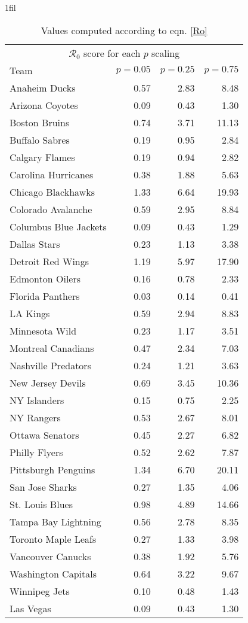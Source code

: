 \documentclass[11pt]{report}            %
\makeatletter
\newcommand{\ro}{\mathcal{R}_0}
\newcommand*{\centerfloat}{%
  \parindent \z@
  \leftskip \z@ \@plus 1fil \@minus \textwidth
  \rightskip\leftskip
  \parfillskip \z@skip}
\makeatother
\begin{document}
\begin{table}[H]
\centerfloat
\begin{tabular}{lrrr}
\hline
\multicolumn{4}{c}{$\ro$ score for each $p$ scaling} \\
Team & $p=0.05$ & $p=0.25$ & $p=0.75$ \\ 
\hline
Anaheim Ducks & 0.57 & 2.83 & 8.48 \\ 
Arizona Coyotes & 0.09 & 0.43 & 1.30 \\ 
Boston Bruins & 0.74 & 3.71 & 11.13 \\ 
Buffalo Sabres & 0.19 & 0.95 & 2.84 \\ 
Calgary Flames & 0.19 & 0.94 & 2.82 \\ 
Carolina Hurricanes & 0.38 & 1.88 & 5.63 \\ 
Chicago Blackhawks & 1.33 & 6.64 & 19.93 \\ 
Colorado Avalanche & 0.59 & 2.95 & 8.84 \\ 
Columbus Blue Jackets & 0.09 & 0.43 & 1.29 \\ 
Dallas Stars & 0.23 & 1.13 & 3.38 \\ 
Detroit Red Wings & 1.19 & 5.97 & 17.90 \\ 
Edmonton Oilers & 0.16 & 0.78 & 2.33 \\ 
Florida Panthers & 0.03 & 0.14 & 0.41 \\ 
LA Kings & 0.59 & 2.94 & 8.83 \\ 
Minnesota Wild & 0.23 & 1.17 & 3.51 \\ 
Montreal Canadians & 0.47 & 2.34 & 7.03 \\ 
Nashville Predators & 0.24 & 1.21 & 3.63 \\ 
New Jersey Devils & 0.69 & 3.45 & 10.36 \\ 
NY Islanders & 0.15 & 0.75 & 2.25 \\ 
NY Rangers & 0.53 & 2.67 & 8.01 \\ 
Ottawa Senators & 0.45 & 2.27 & 6.82 \\ 
Philly Flyers & 0.52 & 2.62 & 7.87 \\ 
Pittsburgh Penguins & 1.34 & 6.70 & 20.11 \\ 
San Jose Sharks & 0.27 & 1.35 & 4.06 \\ 
St. Louis Blues & 0.98 & 4.89 & 14.66 \\ 
Tampa Bay Lightning & 0.56 & 2.78 & 8.35 \\ 
Toronto Maple Leafs & 0.27 & 1.33 & 3.98 \\ 
Vancouver Canucks & 0.38 & 1.92 & 5.76 \\ 
Washington Capitals & 0.64 & 3.22 & 9.67 \\ 
Winnipeg Jets & 0.10 & 0.48 & 1.43 \\ 
Las Vegas & 0.09 & 0.43 & 1.30 \\ 
\hline
\end{tabular}
\caption{Values computed according to eqn. \ref{Ro}}
\label{table:Ro}
\end{table}
\end{document}
